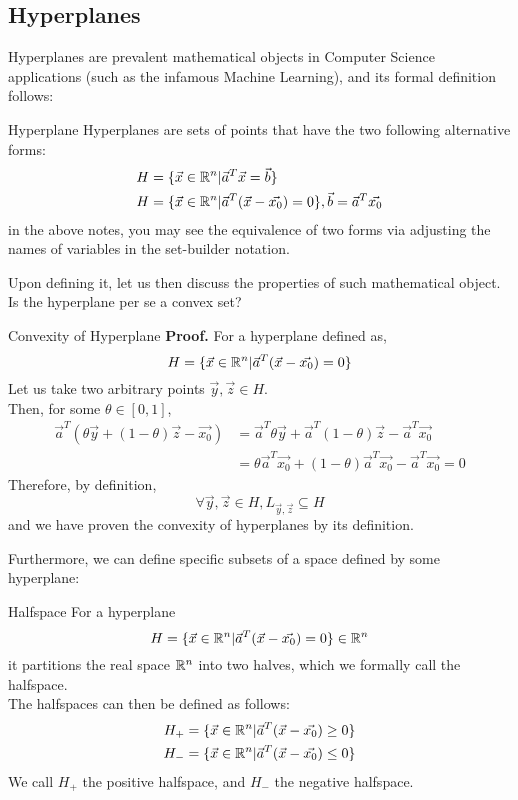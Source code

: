 \subsection{Hyperplanes}
Hyperplanes are prevalent mathematical objects in Computer Science applications (such as the infamous Machine Learning), and its formal definition follows:
\begin{ln-define}{Hyperplane}{}
    Hyperplanes are sets of points that have the two following alternative forms:
    \begin{align*}
        H &= \{\vec{x} \in \mathbb{R}^n | \vec{a}^T \vec{x} = \vec{b}\} \\
        H &= \{\vec{x} \in \mathbb{R}^n | \vec{a}^T (\vec{x} - \vec{x_0}) = 0\}, \vec{b} = \vec{a}^T \vec{x_0}
    \end{align*}
    in the above notes, you may see the equivalence of two forms via adjusting the names of variables in the set-builder notation. \\
\end{ln-define}
Upon defining it, let us then discuss the properties of such mathematical object.
Is the hyperplane per se a convex set?
\begin{ln-explain}{Convexity of Hyperplane}{}
    \textbf{Proof.} For a hyperplane defined as,
    \[
        H = \{\vec{x} \in \mathbb{R}^n | \vec{a}^T (\vec{x} - \vec{x_0}) = 0\}
    \]
    Let us take two arbitrary points $\vec{y}, \vec{z} \in H$. \\
    Then, for some $\theta \in [0, 1]$,
    \begin{align*}
        \vec{a}^T (\theta \vec{y} + (1 - \theta) \vec{z} - \vec{x_0})
        &= \vec{a}^T \theta \vec{y} + \vec{a}^T (1 - \theta) \vec{z} - \vec{a}^T \vec{x_0} \\
        &= \theta \vec{a}^T \vec{x_0} + (1 - \theta) \vec{a}^T \vec{x_0} - \vec{a}^T \vec{x_0} = 0
    \end{align*}
    Therefore, by definition,
    \[
        \forall \vec{y}, \vec{z} \in H, L_{\vec{y}, \vec{z}} \subseteq H
    \]
    and we have proven the convexity of hyperplanes by its definition.
\end{ln-explain}
Furthermore, we can define specific subsets of a space defined by some hyperplane:
\begin{ln-define}{Halfspace}{}
    For a hyperplane
    \[H = \{\vec{x} \in \mathbb{R}^n | \vec{a}^T (\vec{x} - \vec{x_0}) = 0\} \in \mathbb{R}^n\]
    it partitions the real space $\mathbb{R}^n$ into two halves, which we formally call the halfspace. \\
    The halfspaces can then be defined as follows:
    \begin{align*}
        H_+ &= \{\vec{x} \in \mathbb{R}^n | \vec{a}^T (\vec{x} - \vec{x_0}) \geq 0\} \\
        H_- &= \{\vec{x} \in \mathbb{R}^n | \vec{a}^T (\vec{x} - \vec{x_0}) \leq 0\}
    \end{align*}
    We call $H_+$ the positive halfspace, and $H_-$ the negative halfspace.
\end{ln-define}
